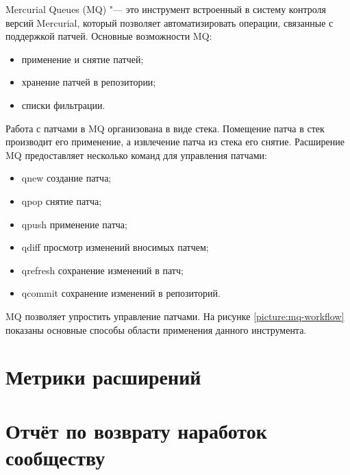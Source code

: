 Mercurial Queues (MQ) "--- это инструмент встроенный в систему контроля версий
Mercurial, который позволяет автоматизировать операции, связанные с поддержкой
патчей. Основные возможности MQ:
\begin{itemize}
  \item применение и снятие патчей;
  \item хранение патчей в репозитории;
  \item списки фильтрации.
\end{itemize}
Работа с патчами в MQ организована в виде стека. Помещение патча в стек
производит его применение, а извлечение патча из стека его снятие. Расширение
MQ предоставляет несколько команд для управления патчами:
\begin{itemize}
  \item qnew создание патча;
  \item qpop снятие патча;
  \item qpush применение патча;
  \item qdiff просмотр изменений вносимых патчем;
  \item qrefresh сохранение изменений в патч;
  \item qcommit сохранение изменений в репозиторий.
\end{itemize}


MQ позволяет упростить управление патчами. На рисунке \ref{picture:mq-workflow}
показаны основные способы области применения данного инструмента.


\section{Метрики расширений}
\section{Отчёт по возврату наработок сообществу}


